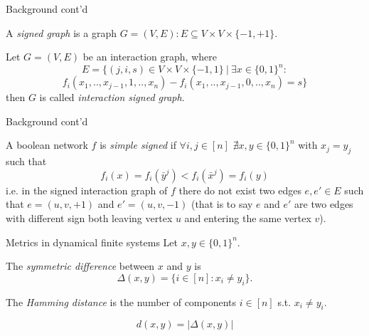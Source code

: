 \documentclass{beamer}
\begin{document}
\begin{frame}{Background cont'd}
    \justifying
    \begin{definition}
        A \textit{signed graph} is a graph $G=(V,E) : E \subseteq V \times V \times \{-1,+1\}.$
    \end{definition}
    \begin{definition}
        Let $G=(V,E)$ be an interaction graph, where
        \[
        E = \{(j,i,s) \in V \times V \times \{-1,1\}\ |\ \exists x \in \{0,1\}^n : \]\[
        f_i(x_1,..,x_{j-1}, 1,..,x_n)-f_i(x_1,..,x_{j-1}, 0,..,x_n)=s \}
        \]
        then $G$ is called \textit{interaction signed graph}.
    \end{definition}
\end{frame}

\begin{frame}{Background cont'd}
\justifying
\begin{definition}
    \justifying
	A boolean network $f$ is \textit{simple signed} if $\forall i,j \in [n]$ $\nexists x,y \in \{0,1\}^n$ with $x_j = y_j$ such that 
	\[
	f_i(x) = f_i(\bar{y}^j) < f_i(\bar{x}^j) = f_i(y)
	\]
	i.e. in the signed interaction graph of $f$ there do not exist two edges $e,e' \in E$ such that $e = (u,v,+1)$ and $e' = (u,v,-1)$ (that is to say $e$ and $e'$ are two edges with different sign both leaving vertex $u$ and entering the same vertex $v$).
\end{definition}
\end{frame}

\begin{frame}{Metrics in dynamical finite systems}
\justifying
Let $x,y \in \{0,1\}^n$.
    \begin{definition}
        The \textit{symmetric difference} between $x$ and $y$ is
        \vspace{-1em}
        \[
            \Delta (x,y) = \{ i \in [n] : x_i \neq y_i\}.
        \]
    \end{definition}
    \begin{definition}
        The \textit{Hamming distance} is the number of components $i \in [n]$ s.t. $x_i \neq y_i.$
    \end{definition}
    \begin{definition}
        \[
           d(x,y)=|\Delta(x,y)|
        \]
    \end{definition}
\end{frame}
\end{document}
